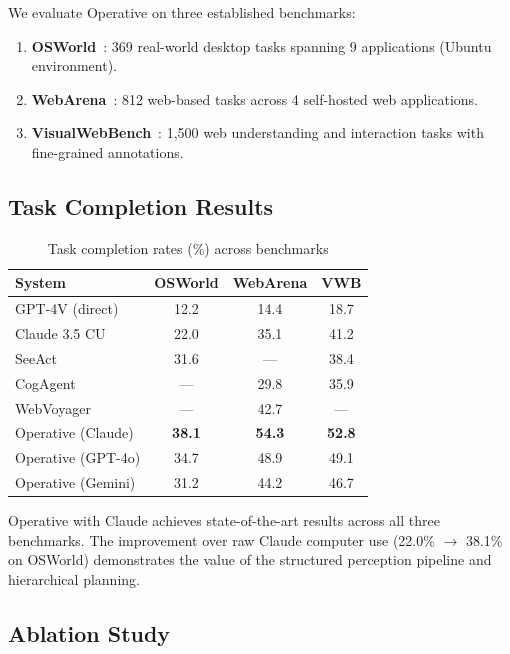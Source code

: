 \documentclass[11pt,twocolumn]{article}
\begin{document}
We evaluate Operative on three established benchmarks:

\begin{enumerate}[leftmargin=*]
    \item \textbf{OSWorld}~\cite{xie2024osworld}: 369 real-world desktop tasks spanning 9 applications (Ubuntu environment).
    \item \textbf{WebArena}~\cite{zhou2024webarena}: 812 web-based tasks across 4 self-hosted web applications.
    \item \textbf{VisualWebBench}~\cite{liu2024visualwebbench}: 1,500 web understanding and interaction tasks with fine-grained annotations.
\end{enumerate}

\subsection{Task Completion Results}

\begin{table}[t]
\centering
\caption{Task completion rates (\%) across benchmarks}
\label{tab:results}
\begin{tabular}{@{}lccc@{}}
\toprule
\textbf{System} & \textbf{OSWorld} & \textbf{WebArena} & \textbf{VWB} \\
\midrule
GPT-4V (direct) & 12.2 & 14.4 & 18.7 \\
Claude 3.5 CU & 22.0 & 35.1 & 41.2 \\
SeeAct & 31.6 & --- & 38.4 \\
CogAgent & --- & 29.8 & 35.9 \\
WebVoyager & --- & 42.7 & --- \\
\midrule
Operative (Claude) & \textbf{38.1} & \textbf{54.3} & \textbf{52.8} \\
Operative (GPT-4o) & 34.7 & 48.9 & 49.1 \\
Operative (Gemini) & 31.2 & 44.2 & 46.7 \\
\bottomrule
\end{tabular}
\end{table}

Operative with Claude achieves state-of-the-art results across all three benchmarks. The improvement over raw Claude computer use (22.0\% $\rightarrow$ 38.1\% on OSWorld) demonstrates the value of the structured perception pipeline and hierarchical planning.

\subsection{Ablation Study}
\end{document}
